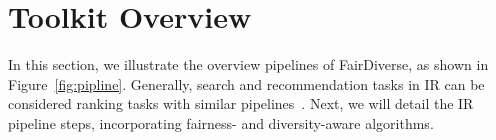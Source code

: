 \vspace*{-2mm}
\section{Toolkit Overview}

In this section, we illustrate the overview pipelines of FairDiverse, as shown in Figure~\ref{fig:pipline}. Generally, search and recommendation tasks in IR can be considered ranking tasks with similar pipelines~\cite{yao2021user, xie2024unifiedssr}. Next, we will detail the IR pipeline steps, incorporating fairness- and diversity-aware algorithms.



